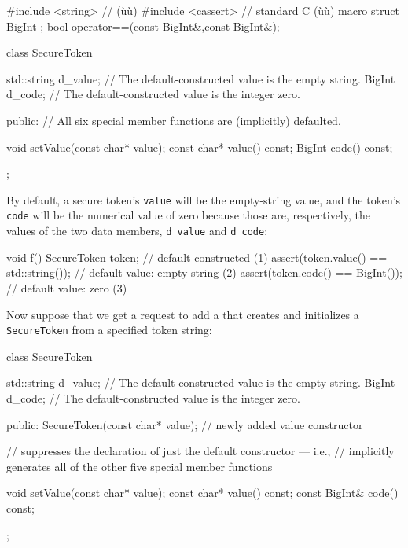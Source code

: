 \begin{emcppshiddenlisting}[emcppsbatch={e1,e2,e3}]
#include <string>   // (ù{}ù)
#include <cassert>  // standard C (ù{}ù) macro
struct BigInt {};
bool operator==(const BigInt&,const BigInt&);
\end{emcppshiddenlisting}
\begin{emcppslisting}[emcppsbatch=e1]
class SecureToken
{
    std::string d_value;  // The default-constructed value is the empty string.
    BigInt      d_code;   // The default-constructed value is the integer zero.

public:
    // All six special member functions are (implicitly) defaulted.

    void setValue(const char* value);
    const char* value() const;
    BigInt code() const;
};
\end{emcppslisting}

\noindent By default, a secure token's \lstinline!value! will be the empty-string
value, and the token's \lstinline!code! will be the numerical value of zero
because those are, respectively, the  values
of the two data members, \lstinline!d_value! and \lstinline!d_code!:

\begin{emcppslisting}[emcppsbatch=e1,label=default-voidf-code]
void f()
{
    SecureToken token;                       // default constructed         (1)
    assert(token.value() == std::string());  // default value: empty string (2)
    assert(token.code() == BigInt());        // default value: zero         (3)
}
\end{emcppslisting}

\noindent Now suppose that we get a request to add a 
that creates and initializes a \lstinline!SecureToken! from a specified
token string:

\begin{emcppslisting}[emcppsbatch=e2]
class SecureToken
{
    std::string d_value;  // The default-constructed value is the empty string.
    BigInt      d_code;   // The default-constructed value is the integer zero.

public:
    SecureToken(const char* value);  // newly added value constructor

    // suppresses the declaration of just the default constructor --- i.e.,
    // implicitly generates all of the other five special member functions

    void setValue(const char* value);
    const char* value() const;
    const BigInt& code() const;
};
\end{emcppslisting}

